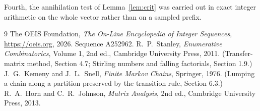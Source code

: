 \documentclass[11pt,a4paper]{article}
\theoremstyle{plain}
\theoremstyle{definition}
\begin{document}
Fourth, the annihilation test of Lemma~\ref{lem:crit} was carried out in exact integer
arithmetic on the whole vector rather than on a sampled prefix.

\begin{thebibliography}{9}
 The OEIS Foundation, \emph{The On-Line Encyclopedia of Integer
Sequences}, \url{https://oeis.org}, 2026. Sequence A252962.
 R.~P.~Stanley, \emph{Enumerative Combinatorics}, Volume 1, 2nd ed.,
Cambridge University Press, 2011. (Transfer-matrix method, Section 4.7; Stirling numbers and
falling factorials, Section 1.9.)
 J.~G.~Kemeny and J.~L.~Snell, \emph{Finite Markov Chains}, Springer,
1976. (Lumping a chain along a partition preserved by the transition rule, Section 6.3.)
 R.~A.~Horn and C.~R.~Johnson, \emph{Matrix Analysis}, 2nd ed., Cambridge
University Press, 2013.
\end{thebibliography}
\end{document}
